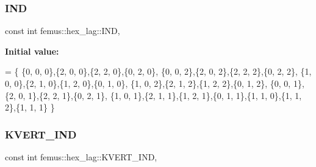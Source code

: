 \subsubsection{\texorpdfstring{I\+ND}{IND}}
{\footnotesize\ttfamily const int femus\+::hex\+\_\+lag\+::\+I\+ND\hspace{0.3cm}{\ttfamily [static]}, {\ttfamily [protected]}}

{\bfseries Initial value\+:}
\begin{DoxyCode}
= \{
    \{0, 0, 0\},\{2, 0, 0\},\{2, 2, 0\},\{0, 2, 0\},
    \{0, 0, 2\},\{2, 0, 2\},\{2, 2, 2\},\{0, 2, 2\},
    \{1, 0, 0\},\{2, 1, 0\},\{1, 2, 0\},\{0, 1, 0\},
    \{1, 0, 2\},\{2, 1, 2\},\{1, 2, 2\},\{0, 1, 2\},
    \{0, 0, 1\},\{2, 0, 1\},\{2, 2, 1\},\{0, 2, 1\},
    \{1, 0, 1\},\{2, 1, 1\},\{1, 2, 1\},\{0, 1, 1\},\{1, 1, 0\},\{1, 1, 2\},\{1, 1, 1\}
  \}
\end{DoxyCode}
\mbox{\label{classfemus_1_1hex__lag_a088be12e7f39449af87bcb23f7e306c0}} 
\subsubsection{\texorpdfstring{K\+V\+E\+R\+T\+\_\+\+I\+ND}{KVERT\_IND}}
{\footnotesize\ttfamily const int femus\+::hex\+\_\+lag\+::\+K\+V\+E\+R\+T\+\_\+\+I\+ND\hspace{0.3cm}{\ttfamily [static]}, {\ttfamily [protected]}}

